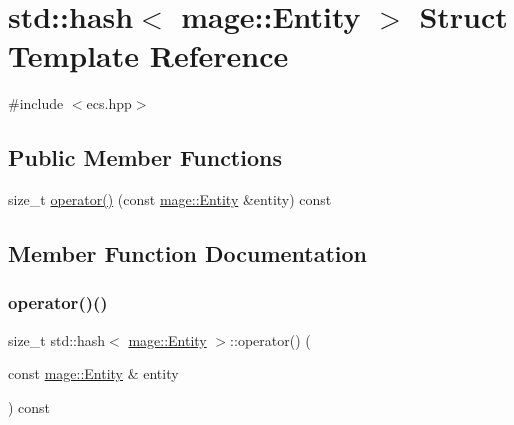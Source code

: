 \hypertarget{structstd_1_1hash_3_01mage_1_1_entity_01_4}{}\section{std\+:\+:hash$<$ mage\+:\+:Entity $>$ Struct Template Reference}
\label{structstd_1_1hash_3_01mage_1_1_entity_01_4}


{\ttfamily \#include $<$ecs.\+hpp$>$}

\subsection*{Public Member Functions}
\begin{DoxyCompactItemize}
\item 
size\+\_\+t \mbox{\hyperlink{structstd_1_1hash_3_01mage_1_1_entity_01_4_a141eb6bc68c35ce43319773ce86aaeb6}{operator()}} (const \mbox{\hyperlink{classmage_1_1_entity}{mage\+::\+Entity}} \&entity) const
\end{DoxyCompactItemize}


\subsection{Member Function Documentation}
\mbox{\label{structstd_1_1hash_3_01mage_1_1_entity_01_4_a141eb6bc68c35ce43319773ce86aaeb6}} 
\subsubsection{\texorpdfstring{operator()()}{operator()()}}
{\footnotesize\ttfamily size\+\_\+t std\+::hash$<$ \mbox{\hyperlink{classmage_1_1_entity}{mage\+::\+Entity}} $>$\+::operator() (\begin{DoxyParamCaption}\item[{const \mbox{\hyperlink{classmage_1_1_entity}{mage\+::\+Entity}} \&}]{entity }\end{DoxyParamCaption}) const}

